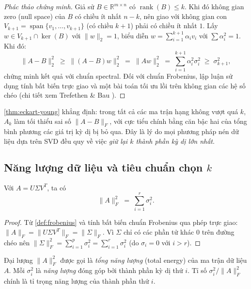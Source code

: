 \begin{proof}[Phác thảo chứng minh]
Giả sử $B \in \mathbb{R}^{m\times n}$ có $\operatorname{rank}(B) \le k$. Khi
đó không gian zero (null space) của $B$ có chiều ít nhất $n - k$, nên giao với
không gian con $V_{k+1} = \operatorname{span}\{v_1, \dots, v_{k+1}\}$ (có chiều
$k+1$) phải có chiều ít nhất $1$. Lấy $w \in V_{k+1} \cap \ker(B)$ với
$\|w\|_2 = 1$, biểu diễn $w = \sum_{i=1}^{k+1}\alpha_i v_i$ với
$\sum \alpha_i^2 = 1$. Khi đó:
\[
    \|A - B\|_2^2 \;\ge\; \|(A-B) w\|_2^2 \;=\; \|A w\|_2^2
              \;=\; \sum_{i=1}^{k+1}\alpha_i^2 \sigma_i^2 \;\ge\; \sigma_{k+1}^2,
\]
chứng minh kết quả với chuẩn spectral. Đối với chuẩn Frobenius, lập luận sử
dụng tính bất biến trực giao và một bài toán tối ưu lồi trên không gian các
hệ số chéo (chi tiết xem Trefethen \& Bau \cite{trefethen1997}).
\end{proof}

\begin{remark}
\cref{thm:eckart-young} khẳng định: trong tất cả các ma trận hạng không vượt
quá $k$, $A_k$ làm tối thiểu sai số $\|A - B\|_F$, với cực tiểu chính bằng
căn bậc hai của tổng bình phương các giá trị kỳ dị bị bỏ qua. Đây là lý do mọi
phương pháp nén dữ liệu dựa trên SVD đều quy về việc \emph{giữ lại $k$ thành
phần kỳ dị lớn nhất}.
\end{remark}

\subsection{Năng lượng dữ liệu và tiêu chuẩn chọn $k$}\label{subsec:energy}

\begin{proposition}\label{prop:energy}
Với $A = U\Sigma V^T$, ta có
\begin{equation}\label{eq:energy-decomp}
    \|A\|_F^2 \;=\; \sum_{i=1}^{r}\sigma_i^2.
\end{equation}
\end{proposition}

\begin{proof}
Từ \cref{def:frobenius} và tính bất biến chuẩn Frobenius qua phép trực giao:
$\|A\|_F = \|U\Sigma V^T\|_F = \|\Sigma\|_F$. Vì $\Sigma$ chỉ có các phần tử
khác $0$ trên đường chéo nên
$\|\Sigma\|_F^2 = \sum_{i=1}^{p}\sigma_i^2 = \sum_{i=1}^{r}\sigma_i^2$
(do $\sigma_i = 0$ với $i > r$).
\end{proof}

\begin{definition}\label{def:energy}
Đại lượng $\|A\|_F^2$ được gọi là \emph{tổng năng lượng} (total energy) của
ma trận dữ liệu $A$. Mỗi $\sigma_i^2$ là \emph{năng lượng} đóng góp bởi thành
phần kỳ dị thứ $i$. Tỉ số
$\sigma_i^2 / \|A\|_F^2$ chính là tỉ trọng năng lượng của thành phần thứ $i$.
\end{definition}

